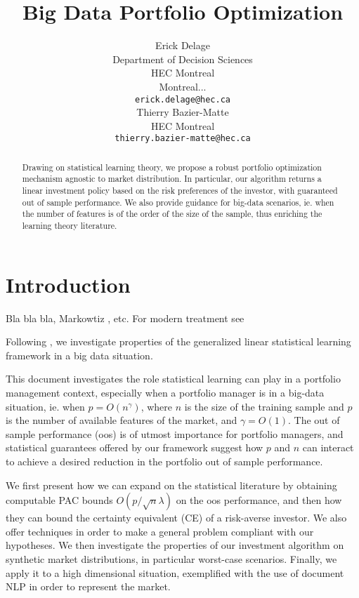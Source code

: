 \documentclass{article}
\title{Big Data Portfolio Optimization}
\author{
  Erick Delage\\
  Department of Decision Sciences\\
  HEC Montreal\\
  Montreal...\\
  \texttt{erick.delage@hec.ca}\\
  \And
  Thierry Bazier-Matte\\
  HEC Montreal\\
  \texttt{thierry.bazier-matte@hec.ca}\\
}
\begin{document}
\maketitle

\begin{abstract}
  Drawing on statistical learning theory, we propose a robust portfolio optimization
  mechanism agnostic to market distribution. In particular, our algorithm returns a linear
  investment policy based on the risk preferences of the investor, with guaranteed out of
  sample performance. We also provide guidance for big-data scenarios, ie. when the number
  of features is of the order of the size of the sample, thus enriching the learning
  theory literature. 
\end{abstract}


\section{Introduction}
\label{sec:intro}



Bla bla bla, Markowtiz \citet{markowitz1952portfolio}, etc. For modern treatment see

Following \citet{rudin2015big}, we investigate properties of the generalized linear
statistical learning framework in a big data situation.


This document investigates the role statistical learning can play in a portfolio
management context, especially when a portfolio manager is in a big-data situation,
ie. when $p=O(n^\gamma)$, where $n$ is the size of the training sample and $p$ is the number of
available features of the market, and $\gamma=O(1)$. The out of sample performance (oos) is of
utmost importance for portfolio managers, and statistical guarantees offered by our
framework suggest how $p$ and $n$ can interact to achieve a desired reduction in the
portfolio out of sample performance.

We first present how we can expand on the statistical literature by obtaining computable
PAC bounds $O(p/\sqrt{n}\lambda)$ on the oos performance, and then how they can bound the
certainty equivalent (CE) of a risk-averse investor. We also offer techniques in order to
make a general problem compliant with our hypotheses. We then investigate the properties
of our investment algorithm on synthetic market distributions, in particular worst-case
scenarios. Finally, we apply it to a high dimensional situation, exemplified with the use
of document NLP in order to represent the market.
\end{document}

